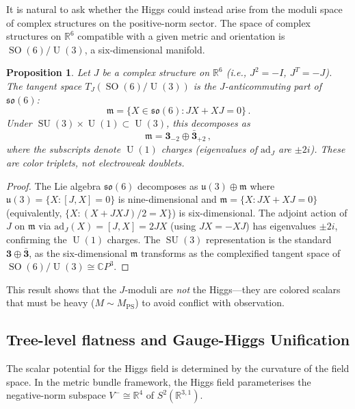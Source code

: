 \documentclass[12pt,a4paper]{article}
\newtheorem{proposition}[theorem]{Proposition}
\theoremstyle{definition}
\newcommand{\SO}{\operatorname{SO}}
\newcommand{\SU}{\operatorname{SU}}
\newcommand{\U}{\operatorname{U}}
\newcommand{\R}{\mathbb{R}}
\newcommand{\C}{\mathbb{C}}
\begin{document}
It is natural to ask whether the Higgs could instead arise from the moduli space of complex structures on the positive-norm sector.
The space of complex structures on $\R^6$ compatible with a given metric and orientation is $\SO(6)/\U(3)$, a six-dimensional manifold.

\begin{proposition}
\label{prop:color_triplets}
Let $J$ be a complex structure on $\R^6$ (i.e., $J^2 = -I$, $J^T = -J$).
The tangent space $T_J(\SO(6)/\U(3))$ is the $J$-anticommuting part of $\mathfrak{so}(6)$:
\[
\mathfrak{m} = \{X \in \mathfrak{so}(6) : JX + XJ = 0\}\,.
\]
Under $\SU(3) \times \U(1) \subset \U(3)$, this decomposes as
\begin{equation}
\mathfrak{m} = \mathbf{3}_{-2} \oplus \bar{\mathbf{3}}_{+2}\,,
\end{equation}
where the subscripts denote $\U(1)$ charges (eigenvalues of $\mathrm{ad}_J$ are $\pm 2i$).
These are \emph{color triplets}, not electroweak doublets.
\end{proposition}

\begin{proof}
The Lie algebra $\mathfrak{so}(6)$ decomposes as $\mathfrak{u}(3) \oplus \mathfrak{m}$ where $\mathfrak{u}(3) = \{X : [J, X] = 0\}$ is nine-dimensional and $\mathfrak{m} = \{X : JX + XJ = 0\}$ (equivalently, $\{X : (X + JXJ)/2 = X\}$) is six-dimensional.
The adjoint action of $J$ on $\mathfrak{m}$ via $\mathrm{ad}_J(X) = [J, X] = 2JX$ (using $JX = -XJ$) has eigenvalues $\pm 2i$, confirming the $\U(1)$ charges.
The $\SU(3)$ representation is the standard $\mathbf{3} \oplus \bar{\mathbf{3}}$, as the six-dimensional $\mathfrak{m}$ transforms as the complexified tangent space of $\SO(6)/\U(3) \cong \C P^3$.
\end{proof}

This result shows that the $J$-moduli are \emph{not} the Higgs---they are colored scalars that must be heavy ($M \sim M_{\mathrm{PS}}$) to avoid conflict with observation.


\subsection{Tree-level flatness and Gauge-Higgs Unification}

The scalar potential for the Higgs field is determined by the curvature of the field space.
In the metric bundle framework, the Higgs field parameterises the negative-norm subspace $V^- \cong \R^4$ of $S^2(\R^{3,1})$.
\end{document}

